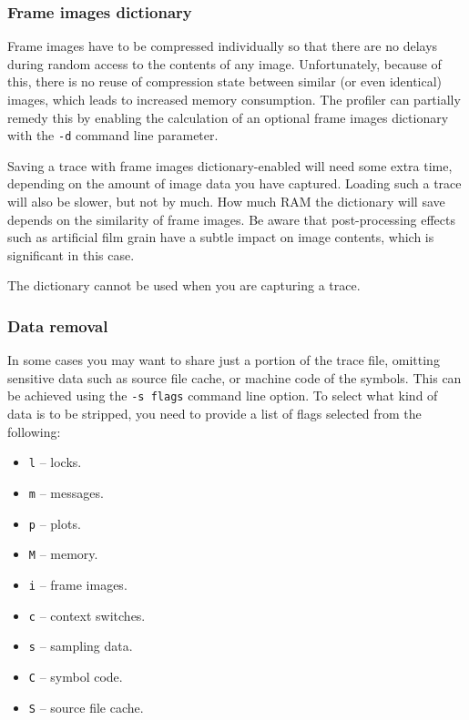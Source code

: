 \documentclass[hidelinks,titlepage,a4paper,twoside]{article}
\begin{document}
\subsubsection{Frame images dictionary}
\label{fidict}

Frame images have to be compressed individually so that there are no delays during random access to the contents of any image. Unfortunately, because of this, there is no reuse of compression state between similar (or even identical) images, which leads to increased memory consumption. The profiler can partially remedy this by enabling the calculation of an optional frame images dictionary with the \texttt{-d} command line parameter.

Saving a trace with frame images dictionary-enabled will need some extra time, depending on the amount of image data you have captured. Loading such a trace will also be slower, but not by much. How much RAM the dictionary will save depends on the similarity of frame images. Be aware that post-processing effects such as artificial film grain have a subtle impact on image contents, which is significant in this case.

The dictionary cannot be used when you are capturing a trace.

\subsubsection{Data removal}
\label{dataremoval}

In some cases you may want to share just a portion of the trace file, omitting sensitive data such as source file cache, or machine code of the symbols. This can be achieved using the \texttt{-s flags} command line option. To select what kind of data is to be stripped, you need to provide a list of flags selected from the following:

\begin{itemize}
\item \texttt{l} -- locks.
\item \texttt{m} -- messages.
\item \texttt{p} -- plots.
\item \texttt{M} -- memory.
\item \texttt{i} -- frame images.
\item \texttt{c} -- context switches.
\item \texttt{s} -- sampling data.
\item \texttt{C} -- symbol code.
\item \texttt{S} -- source file cache.
\end{itemize}
\end{document}
